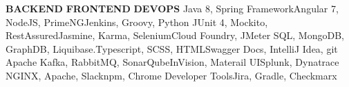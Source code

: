 


\begin{cvskills}


\cvskill
{\textbf{BACKEND}} {\textbf{FRONTEND}} {\textbf{DEVOPS}}
\cvskill
{Java 8, Spring Framework}{Angular 7, NodeJS, PrimeNG}{Jenkins, Groovy, Python}
\cvskill
{JUnit 4, Mockito, RestAssured}{Jasmine, Karma, Selenium}{Cloud Foundry, JMeter}
\cvskill
{SQL, MongoDB, GraphDB, Liquibase.}{Typescript, SCSS, HTML}{Swagger Docs, IntelliJ Idea, git}
\cvskill
{Apache Kafka, RabbitMQ, SonarQube}{InVision, Materail UI}{Splunk, Dynatrace}
\cvskill
{NGINX, Apache, Slack}{npm,  Chrome Developer Tools}{Jira, Gradle, Checkmarx}
\end{cvskills}